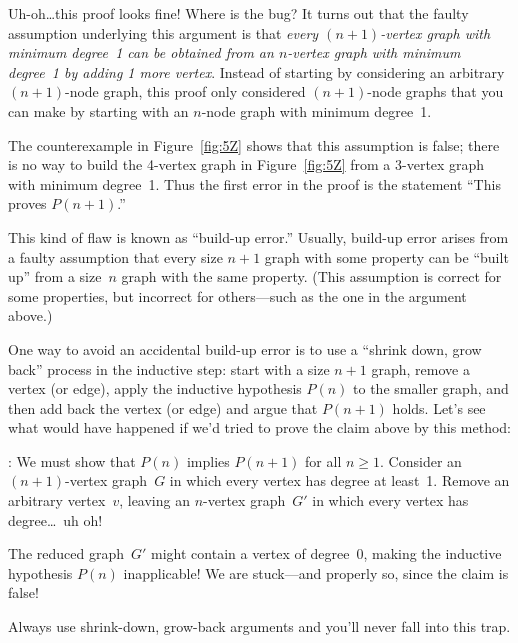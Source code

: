 Uh-oh\dots this proof looks fine!  Where is the bug?  It turns out
that the faulty assumption underlying this argument is that
\emph{every $(n + 1)$-vertex graph with minimum degree~1 can be
obtained from an $n$-vertex graph with minimum degree~1 by adding 1
more vertex}.  Instead of starting by considering an arbitrary $(n +
1)$-node graph, this proof only considered $(n + 1)$-node graphs
that you can make by starting with an $n$-node graph with minimum
degree~1.

The counterexample in Figure~\ref{fig:5Z} shows that this assumption
is false; there is no way to build the 4-vertex graph in
Figure~\ref{fig:5Z} from a 3-vertex graph with minimum degree~1.
Thus the first error in the proof is the statement ``This proves
$P(n + 1)$.''

This kind of flaw is known as ``build-up error.''  Usually, build-up
error arises from a faulty assumption that every size $n + 1$ graph
with some property can be ``built up'' from a size~$n$ graph with the
same property.  (This assumption is correct for some properties, but
incorrect for others---such as the one in the argument above.)

One way to avoid an accidental build-up error is to use a ``shrink
down, grow back'' process in the inductive step: \ie start with a size
$n+1$ graph, remove a vertex (or edge), apply the inductive hypothesis
$P(n)$ to the smaller graph, and then add back the vertex (or edge)
and argue that $P(n + 1)$ holds.  Let's see what would have happened
if we'd tried to prove the claim above by this method:

: We must show that $P(n)$
implies $P(n + 1)$ for all $n \ge 1$.  Consider an $(n + 1)$-vertex
graph~$G$ in which every vertex has degree at least~1.  Remove an
arbitrary vertex~$v$, leaving an $n$-vertex graph~$G'$ in which every
vertex has degree\dots\ uh oh!

The reduced graph~$G'$ might contain a vertex of degree~0, making the
inductive hypothesis $P(n)$ inapplicable!  We are stuck---and
properly so, since the claim is false!

Always use shrink-down, grow-back arguments and you'll never fall into
this trap.



\begin{problems}
\classproblems
{}
\homeworkproblems
{}


\homeworkproblems
{}
\end{problems}

